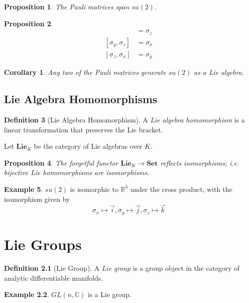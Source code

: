\documentclass{book}
\newtheorem{prop}{Proposition}[chapter]
\newtheorem{cor}{Corollary}[prop]
\theoremstyle{definition}
\newtheorem{df}[prop]{Definition}
\newtheorem{ex}[prop]{Example}
\newcommand{\Set}{\ensuremath{\mathbf{Set}}}
\begin{document}
\begin{prop}
The Pauli matrices span $su(2)$.
\end{prop}

\begin{prop}
\begin{align*}
[\sigma_x, \sigma_y] & = \sigma_z \\
[\sigma_y, \sigma_z] & = \sigma_x \\
[\sigma_z, \sigma_x] & = \sigma_y
\end{align*}
\end{prop}

\begin{cor}
Any two of the Pauli matrices generate $su(2)$ as a Lie algebra.
\end{cor}

\section{Lie Algebra Homomorphisms}

\begin{df}[Lie Algebra Homomorphism]
A \emph{Lie algebra homomorphism} is a linear transformation that preserves the Lie bracket.

Let $\mathbf{Lie}_K$ be the category of Lie algebras over $K$.
\end{df}

\begin{prop}
The forgetful functor $\mathbf{Lie}_K \rightarrow \Set$ reflects isomorphisms; i.e. bijective Lie homomorphisms are isomorphisms.
\end{prop}


\begin{ex}
$su(2)$ is isomorphic to $\mathbb{R}^3$ under the cross product, with the isomorphism given by
\[ \sigma_x \mapsto \vec{i}, \sigma_y \mapsto \vec{j}, \sigma_z \mapsto \vec{k} \]
\end{ex}

\chapter{Lie Groups}

\begin{df}[Lie Group]
A \emph{Lie group} is a group object in the category of analytic differentiable manifolds.
\end{df}

\begin{ex}
$GL(n,\mathbb{C})$ is a Lie group.
\end{ex}
\end{document}
